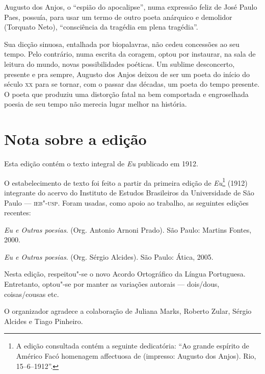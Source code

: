 Augusto dos Anjos, o “espião do apocalipse”, numa expressão feliz de
José Paulo Paes, possuía, para usar um termo de outro poeta anárquico e
demolidor (Torquato Neto), “consciência da tragédia em plena tragédia”.


Sua dicção sinuosa, entalhada por biopalavras, não cedeu concessões
ao seu tempo. Pelo contrário, numa escrita da coragem, optou por
instaurar, na sala de leitura do mundo, novas possibilidades poéticas.
Um sublime desconcerto, presente e pra sempre, Augusto dos Anjos deixou
de ser um poeta do início do século \textsc{xx} para se tornar, com o passar das
décadas, um poeta do tempo presente. O poeta que produziu uma distorção
fatal na bem comportada e engroselhada poesia de seu tempo não merecia
lugar melhor na história. 


\section{Nota sobre a edição}

Esta edição contém o texto integral de \textit{Eu} publicado em 1912.

O estabelecimento de texto foi feito a partir da primeira edição de
\textit{Eu}\footnote{ A edição consultada contém a seguinte
dedicatória: “Ao grande espírito de Américo Facó homenagem affectuosa
de (impresso: Augusto dos Anjos). Rio, 15--6--1912”.} (1912)
integrante do acervo do Instituto de Estudos Brasileiros da
Universidade de São Paulo --- \textsc{ieb"-usp}. Foram usadas, como
apoio ao trabalho, as seguintes edições recentes:

\textit{Eu e Outras poesias}. (Org. Antonio Arnoni Prado). São Paulo:
Martins Fontes, 2000.

\textit{Eu e Outras poesias}. (Org. Sérgio Alcides). São Paulo: Ática,
2005.

Nesta edição, respeitou"-se o novo Acordo Ortográfico da Língua
Portuguesa. Entretanto, optou"-se por manter as variações autorais ---
dois/dous, coisas/cousas etc.

O organizador agradece a colaboração de Juliana Marks, Roberto Zular,
Sérgio Alcides e Tiago Pinheiro.




